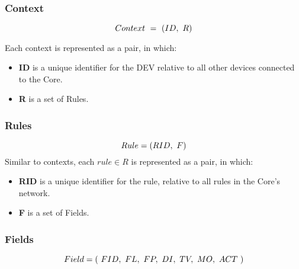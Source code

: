 \documentclass[cspaper]{IEEEtran}
\numberwithin{equation}{subsection}
\begin{document}
	\vspace{1em}
	\subsubsection{Context}
	
	\begin{equation}\notag
		Context \ = \ (ID, \ R)
	\end{equation}

	Each context is represented as a pair, in which:
	\begin{itemize}
		\item \textbf{ID} is a unique identifier for the DEV relative to all other devices connected to the Core. 
		\item \textbf{R} is a set of Rules.
	\end{itemize} 

	\vspace{1em}
	\subsubsection{Rules}
	\begin{equation}\notag
		Rule = (RID, \ F)	
	\end{equation}
	Similar to contexts, each $rule \in R$ is represented as a pair, in which:
	\begin{itemize}
		\item \textbf{RID} is a unique identifier for the rule, relative to all rules in the Core's network.
		\item \textbf{F} is a set of Fields.
	\end{itemize}

	\vspace{1em}
	\subsubsection{Fields}
	\begin{equation}\notag	
		Field = (\ FID, \ FL, \ FP, \ DI, \ TV, \ MO, \ ACT \ )
	\end{equation}
\end{document}
